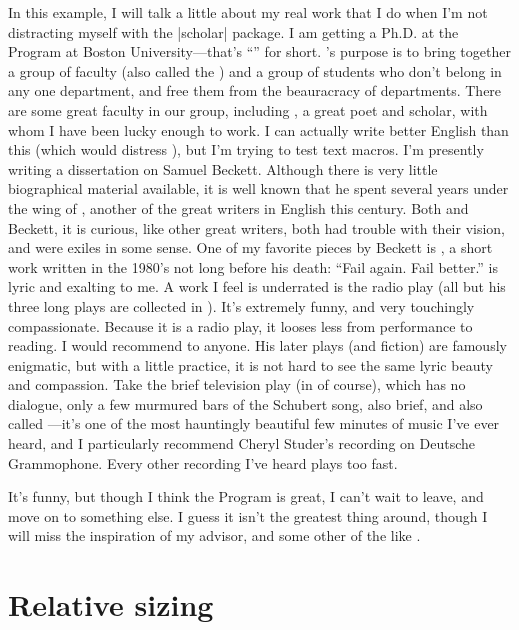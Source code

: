 \documentclass{article}
\begin{document}
In this example, I will talk a little about my real work that I do when I'm not
distracting myself with the |scholar| package.  I am getting a Ph.D. at the
\uni Program at Boston University---that's ``\uni'' for short.  \uni's purpose
is to bring together a group of faculty (also called the \unilong) and a group
of students who don't belong in any one department, and free them from the
beauracracy of departments.  There are some great faculty in our group,
including \hill, a great poet and scholar, with whom I have been lucky enough
to work.  I can actually write better English than this (which would distress
\hill), but I'm trying to test text macros.  I'm presently writing a
dissertation on Samuel Beckett.  Although there is very little biographical
material available, it is well known that he spent several years under the wing
of \joyce, another of the great writers in English this century.  Both \joyce
and Beckett, it is curious, like other great writers, both had trouble with
their vision, and were exiles in some sense.  One of my favorite pieces by
Beckett is \worst, a short work written in the 1980's not long before his
death: ``Fail again.  Fail better.''  \worst is lyric and exalting to me.  A
work I feel is underrated is the radio play \fall (all but his three long plays
are collected in \csp).  It's extremely funny, and very touchingly
compassionate.  Because it is a radio play, it looses less from performance to
reading.  I would recommend \fall to anyone.  His later plays (and fiction) are
famously enigmatic, but with a little practice, it is not hard to see the same
lyric beauty and compassion.  Take the brief television play \nacht (in \csp of
course), which has no dialogue, only a few murmured bars of the Schubert song,
also brief, and also called \nacht---it's one of the most hauntingly beautiful
few minutes of music I've ever heard, and I particularly recommend Cheryl
Studer's recording on Deutsche Grammophone.  Every other recording I've heard
plays too fast.

\ResetAbbrevs

It's funny, but though I think the \unishort Program is great, I can't wait to
leave, and move on to something else.  I guess it isn't the greatest thing
around, though I will miss the inspiration of my advisor, and some other of the
\uni like \hill.

\section{Relative sizing}
\end{document}
